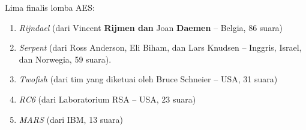 \documentclass{article}
\begin{document}

Lima finalis lomba AES:
\begin{enumerate}
  \item \textit{Rijndael} (dari Vincent \textbf{Rijmen dan} Joan \textbf{Daemen} -- Belgia, 86 suara)
  \item \textit{Serpent} (dari Ross Anderson, Eli Biham, dan Lars Knudsen -- Inggris, Israel, dan Norwegia, 59 suara).
  \item \textit{Twofish} (dari tim yang diketuai oleh Bruce Schneier -- USA, 31 suara)
  \item \textit{RC6} (dari Laboratorium RSA -- USA, 23 suara)
  \item \textit{MARS} (dari IBM, 13 suara)
\end{enumerate}
\end{document}
